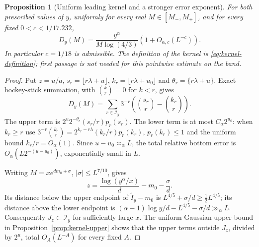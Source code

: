 \documentclass[11pt]{article}
\newtheorem{proposition}{Proposition}
\theoremstyle{remark}\newtheorem{remark}[proposition]{Remark}
\begin{document}
\begin{proposition}[Uniform leading kernel and a stronger error exponent]
\label{prop:kernel-leading}
For both prescribed values of $y$, uniformly for every real
$M\in[M_-,M_+]$, and for every fixed $0<c<1/17.232$,
\begin{equation}\label{eq:kernel-leading}
 D_y(M)=\frac{y^\alpha}{M\log(4/3)}
          \left(1+O_{\alpha,c}(L^{-c})\right).
\end{equation}
In particular $c=1/18$ is admissible. The definition of the kernel
is \eqref{eq:kernel-definition}; first passage is not needed for this
pointwise estimate on the band.
\end{proposition}
\begin{proof}
Put $z=u/a$, $s_r=\lfloor r\lambda+u\rfloor$,
$k_r=\lfloor r\lambda+u_0\rfloor$ and
$\theta_r=\{r\lambda+u\}$. Exact hockey-stick summation, with
$\binom{k}{r}=0$ for $k<r$, gives
\[
 D_y(M)=\sum_{r\in\mathcal I_y}3^{-r}
             \left(\binom{s_r}{r}-\binom{k_r}{r}\right).
\]
The upper term is $2^u2^{-\theta_r}(s_r/r)p_r(s_r)$.
The lower term is at most $C_\alpha2^{u_0}$: when $k_r\ge r$ use
$3^{-r}\binom{k_r}{r}=2^{k_r-r\lambda}(k_r/r)p_r(k_r)$,
$p_r(k_r)\le1$ and the uniform bound $k_r/r=O_\alpha(1)$.
Since $u-u_0\asymp_\alpha L$, the total relative bottom error is
$O_\alpha(L2^{-(u-u_0)})$, exponentially small in $L$.

Writing $M=xe^{dm_0+\sigma}$, $|\sigma|\le L^{7/10}$, gives
\[
 z=\frac{\log(y^\alpha/x)}d-m_0-\frac\sigma d.
\]
Its distance below the upper endpoint of
$\widetilde I_y-m_0$ is $L^{4/5}+\sigma/d\ge\tfrac12 L^{4/5}$;
its distance above the lower endpoint is
$(\alpha-1)\log y/d-L^{4/5}-\sigma/d\gg_\alpha L$.
Consequently $J_z\subset\mathcal I_y$ for sufficiently large $x$.
The uniform Gaussian upper bound in Proposition~\ref{prop:kernel-upper}
shows that the upper terms outside $J_z$, divided by $2^u$, total
$O_A(L^{-A})$ for every fixed $A$.


\end{proof}
\end{document}
